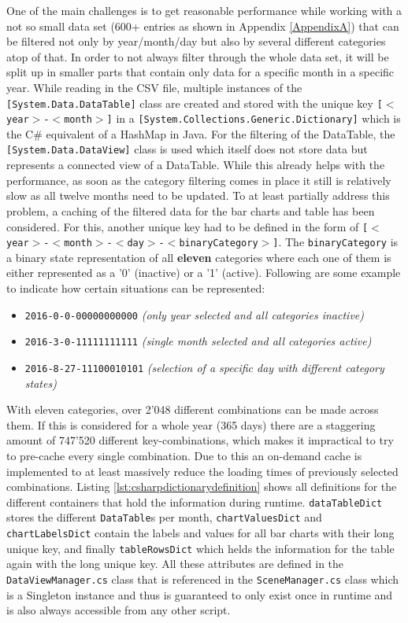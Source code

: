 One of the main challenges is to get reasonable performance while working with a not so small data set (600+ entries as shown in Appendix \ref{AppendixA}) that can be filtered not only by year/month/day but also by several different categories atop of that. In order to not always filter through the whole data set, it will be split up in smaller parts that contain only data for a specific month in a specific year. While reading in the CSV file, multiple instances of the \texttt{[System.Data.DataTable]} class are created and stored with the unique key \texttt{[$<$year$>$-$<$month$>$]} in a \texttt{[System.Collections.Generic.Dictionary]} which is the C\# equivalent of a HashMap in Java. For the filtering of the DataTable, the \texttt{[System.Data.DataView]} class is used which itself does not store data but represents a connected view of a DataTable. While this already helps with the performance, as soon as the category filtering comes in place it still is relatively slow as all twelve months need to be updated. \newline
To at least partially address this problem, a caching of the filtered data for the bar charts and table has been considered. For this, another unique key had to be defined in the form of \texttt{[$<$year$>$-$<$month$>$-$<$day$>$-$<$binaryCategory$>$]}. The \texttt{binaryCategory} is a binary state representation of all \textbf{eleven} categories where each one of them is either represented as a '0' (inactive) or a '1' (active). Following are some example to indicate how certain situations can be represented:
\begin{itemize}[noitemsep,nolistsep]
	\item \texttt{2016-0-0-00000000000} \textit{(only year selected and all categories inactive)}
	\item \texttt{2016-3-0-11111111111} \textit{(single month selected and all categories active)}
	\item \texttt{2016-8-27-11100010101} \textit{(selection of a specific day with different category states)}
\end{itemize}
With eleven categories, over 2'048 different combinations can be made across them. If this is considered for a whole year (365 days) there are a staggering amount of 747'520 different key-combinations, which makes it impractical to try to pre-cache every single combination. Due to this an on-demand cache is implemented to at least massively reduce the loading times of previously selected combinations. Listing \ref{lst:csharpdictionarydefinition} shows all definitions for the different containers that hold the information during runtime. \texttt{dataTableDict} stores the different \texttt{DataTable}s per month, \texttt{chartValuesDict} and \texttt{chartLabelsDict} contain the labels and values for all bar charts with their long unique key, and finally \texttt{tableRowsDict} which helds the information for the table again with the long unique key. All these attributes are defined in the \texttt{DataViewManager.cs} class that is referenced in the \texttt{SceneManager.cs} class which is a Singleton instance and thus is guaranteed to only exist once in runtime and is also always accessible from any other script.
